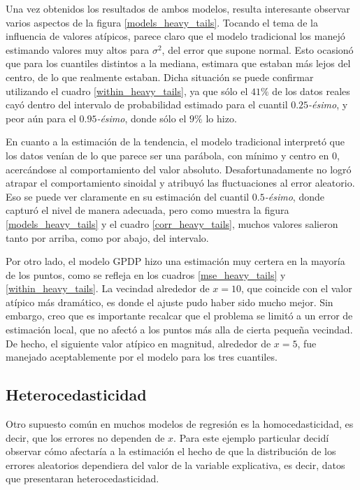 Una vez obtenidos los resultados de ambos modelos, resulta interesante observar varios aspectos de la figura \ref{models_heavy_tails}. Tocando el tema de la influencia de valores at\'ipicos, parece claro que el modelo tradicional los manej\'o estimando valores muy altos para $\sigma^2$, del error que supone normal. Esto ocasion\'o que para los cuantiles distintos a la mediana, estimara que estaban m\'as lejos del centro, de lo que realmente estaban. Dicha situaci\'on se puede confirmar utilizando el cuadro \ref{within_heavy_tails}, ya que s\'olo el $41\%$ de los datos reales cay\'o dentro del intervalo de probabilidad estimado para el cuantil $0.25$\textit{-\'esimo}, y peor a\'un para el $0.95$\textit{-\'esimo}, donde s\'olo el $9\%$ lo hizo.

En cuanto a la estimaci\'on de la tendencia, el modelo tradicional interpret\'o que los datos ven\'ian de lo que parece ser una par\'abola, con m\'inimo y centro en 0, acerc\'andose al comportamiento del valor absoluto. Desafortunadamente no logr\'o atrapar el comportamiento sinoidal y atribuy\'o las fluctuaciones al error aleatorio. Eso se puede ver claramente en su estimaci\'on del cuantil $0.5$\textit{-\'esimo}, donde captur\'o el nivel de manera adecuada, pero como muestra la figura \ref{models_heavy_tails} y el cuadro \ref{corr_heavy_tails}, muchos valores salieron tanto por arriba, como por abajo, del intervalo.

Por otro lado, el modelo GPDP hizo una estimaci\'on muy certera en la mayor\'ia de los puntos, como se refleja en los cuadros \ref{mse_heavy_tails} y \ref{within_heavy_tails}. La vecindad alrededor de $x = 10$, que coincide con el valor at\'ipico m\'as dram\'atico, es donde el ajuste pudo haber sido mucho mejor. Sin embargo, creo que es importante recalcar que el problema se limit\'o a un error de estimaci\'on local, que no afect\'o a los puntos m\'as alla de cierta pequeña vecindad. De hecho, el siguiente valor at\'ipico en magnitud, alrededor de $x = 5$, fue manejado aceptablemente por el modelo para los tres cuantiles.

\subsection{Heterocedasticidad}

Otro supuesto com\'un en muchos modelos de regresi\'on es la homocedasticidad, es decir, que los errores no dependen de $x$. Para este ejemplo particular decid\'i observar c\'omo afectar\'ia a la estimaci\'on el hecho de que la distribuci\'on de los errores aleatorios dependiera del valor de la variable explicativa, es decir, datos que presentaran heterocedasticidad.

